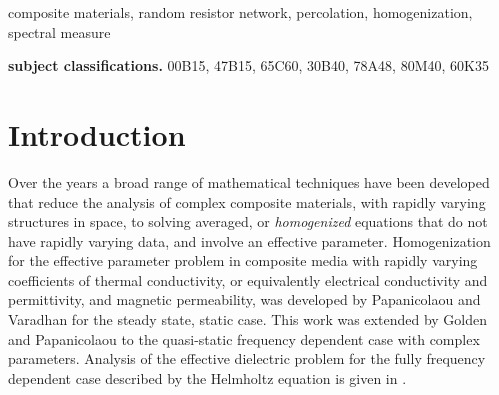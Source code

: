 \documentclass{cmslatex}
\begin{document}
\begin{keywords}
composite materials, random resistor network, percolation,
homogenization, spectral measure 
\smallskip

{\bf subject classifications.}
00B15,
47B15,
65C60,
30B40,
78A48,
80M40,
60K35
\end{keywords}


\section{Introduction}\label{Introduction}
%
Over the years a broad range of mathematical techniques have been
developed that reduce the analysis of complex composite materials,
with rapidly varying structures in space, to solving averaged, or
\emph{homogenized} equations that do not have rapidly varying data,
and involve an effective parameter. Homogenization for the effective
parameter problem in composite media with rapidly varying coefficients
of thermal conductivity, or equivalently \cite{MILTON:2002:TC}
electrical conductivity and permittivity, and magnetic permeability,
was developed by Papanicolaou and Varadhan \cite{Papanicolaou:RF-835}
for the steady state, static case. This work was extended
\cite{Golden:CMP-473,Golden:JSP-655} by Golden and Papanicolaou to the
quasi-static frequency dependent case with complex
parameters. Analysis of the effective dielectric problem for the fully
frequency dependent case described by the Helmholtz equation is given
in \cite{Simeonova:MMS:1113}. 
\end{document}
